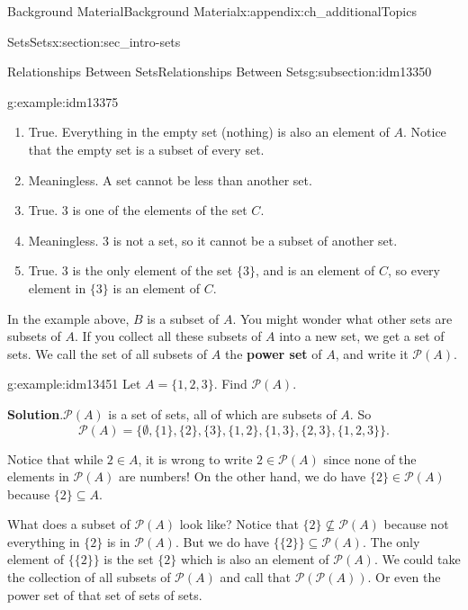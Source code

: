 \documentclass[oneside,10pt,]{book}
\newcommand{\terminology}[1]{\textbf{#1}}
\numberwithin{equation}{chapter}
\def\pow{\mathcal P}
\begin{document}
\begin{appendixptx}{Background Material}{}{Background Material}{}{}{x:appendix:ch_additionalTopics}
\begin{sectionptx}{Sets}{}{Sets}{}{}{x:section:sec_intro-sets}
\begin{subsectionptx}{Relationships Between Sets}{}{Relationships Between Sets}{}{}{g:subsection:idm13350}
\begin{example}{}{g:example:idm13375}
\begin{enumerate}
\item{}True. Everything in the empty set (nothing) is also an element of \(A\). Notice that the empty set is a subset of every set.%
\item{}Meaningless. A set cannot be less than another set.%
\item{}True. \(3\) is one of the elements of the set \(C\).%
\item{}Meaningless. \(3\) is not a set, so it cannot be a subset of another set.%
\item{}True. \(3\) is the only element of the set \(\{3\}\), and is an element of \(C\), so every element in \(\{3\}\) is an element of \(C\).%
\end{enumerate}
%
\end{example}
In the example above, \(B\) is a subset of \(A\). You might wonder what other sets are subsets of \(A\). If you collect all these subsets of \(A\) into a new set, we get a set of sets. We call the set of all subsets of \(A\) the \terminology{power set}  of \(A\), and write it \(\pow(A)\).%
\begin{example}{}{g:example:idm13451}%
Let \(A = \{1,2,3\}\). Find \(\pow(A)\).%
\par\smallskip%
\noindent\textbf{Solution}.\hypertarget{g:solution:idm13456}{}\quad{}\(\pow(A)\) is a set of sets, all of which are subsets of \(A\). So%
\begin{equation*}
\pow(A) = \{ \emptyset, \{1\}, \{2\}, \{3\}, \{1,2\}, \{1, 3\}, \{2,3\}, \{1,2,3\}\}.
\end{equation*}
%
\par
Notice that while \(2 \in A\), it is wrong to write \(2 \in \pow(A)\) since none of the elements in \(\pow(A)\) are numbers! On the other hand, we do have \(\{2\} \in \pow(A)\) because \(\{2\} \subseteq A\).%
\par
What does a subset of \(\pow(A)\) look like? Notice that \(\{2\} \not\subseteq \pow(A)\) because not everything in \(\{2\}\) is in \(\pow(A)\). But we do have \(\{ \{2\} \} \subseteq \pow(A)\). The only element of \(\{\{2\}\}\) is the set \(\{2\}\) which is also an element of \(\pow(A)\). We could take the collection of all subsets of \(\pow(A)\) and call that \(\pow(\pow(A))\). Or even the power set of that set of sets of sets.%
\end{example}

\end{subsectionptx}
\end{sectionptx}
\end{appendixptx}
\end{document}
